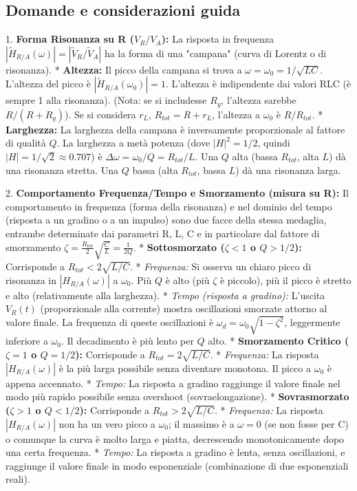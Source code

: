 \documentclass[a4paper, 11pt]{article}
\newcommand{\abs}[1]{\left|#1\right|}
\begin{document}
\subsection{Domande e considerazioni guida}

1.  \textbf{Forma Risonanza su R ($V_R/V_A$):} La risposta in frequenza $\abs{\tilde{H}_{R/A}(\omega)} = \abs{\tilde{V}_R / \tilde{V}_A}$ ha la forma di una "campana" (curva di Lorentz o di risonanza).
    *   \textbf{Altezza:} Il picco della campana si trova a $\omega = \omega_0 = 1/\sqrt{LC}$. L'altezza del picco è $\abs{\tilde{H}_{R/A}(\omega_0)} = 1$. L'altezza è indipendente dai valori RLC (è sempre 1 alla risonanza). (Nota: se si includesse $R_g$, l'altezza sarebbe $R/(R+R_g)$). Se si considera $r_L$, $R_{tot}=R+r_L$, l'altezza a $\omega_0$ è $R/R_{tot}$.
    *   \textbf{Larghezza:} La larghezza della campana è inversamente proporzionale al fattore di qualità $Q$. La larghezza a metà potenza (dove $\abs{H}^2 = 1/2$, quindi $\abs{H} = 1/\sqrt{2} \approx 0.707$) è $\Delta \omega = \omega_0 / Q = R_{tot} / L$. Una $Q$ alta (bassa $R_{tot}$, alta $L$) dà una risonanza stretta. Una $Q$ bassa (alta $R_{tot}$, bassa $L$) dà una risonanza larga.

2.  \textbf{Comportamento Frequenza/Tempo e Smorzamento (misura su R):} Il comportamento in frequenza (forma della risonanza) e nel dominio del tempo (risposta a un gradino o a un impulso) sono due facce della stessa medaglia, entrambe determinate dai parametri R, L, C e in particolare dal fattore di smorzamento $\zeta = \frac{R_{tot}}{2} \sqrt{\frac{C}{L}} = \frac{1}{2Q}$.
    *   \textbf{Sottosmorzato ($\zeta < 1$ o $Q > 1/2$):} Corrisponde a $R_{tot} < 2\sqrt{L/C}$.
        *   \textit{Frequenza:} Si osserva un chiaro picco di risonanza in $\abs{H_{R/A}(\omega)}$ a $\omega_0$. Più $Q$ è alto (più $\zeta$ è piccolo), più il picco è stretto e alto (relativamente alla larghezza).
        *   \textit{Tempo (risposta a gradino):} L'uscita $V_R(t)$ (proporzionale alla corrente) mostra oscillazioni smorzate attorno al valore finale. La frequenza di queste oscillazioni è $\omega_d = \omega_0 \sqrt{1-\zeta^2}$, leggermente inferiore a $\omega_0$. Il decadimento è più lento per $Q$ alto.
    *   \textbf{Smorzamento Critico ($\zeta = 1$ o $Q = 1/2$):} Corrisponde a $R_{tot} = 2\sqrt{L/C}$.
        *   \textit{Frequenza:} La risposta $\abs{H_{R/A}(\omega)}$ è la più larga possibile senza diventare monotona. Il picco a $\omega_0$ è appena accennato.
        *   \textit{Tempo:} La risposta a gradino raggiunge il valore finale nel modo più rapido possibile senza overshoot (sovraelongazione).
    *   \textbf{Sovrasmorzato ($\zeta > 1$ o $Q < 1/2$):} Corrisponde a $R_{tot} > 2\sqrt{L/C}$.
        *   \textit{Frequenza:} La risposta $\abs{H_{R/A}(\omega)}$ non ha un vero picco a $\omega_0$; il massimo è a $\omega=0$ (se non fosse per C) o comunque la curva è molto larga e piatta, decrescendo monotonicamente dopo una certa frequenza.
        *   \textit{Tempo:} La risposta a gradino è lenta, senza oscillazioni, e raggiunge il valore finale in modo esponenziale (combinazione di due esponenziali reali).
\end{document}
